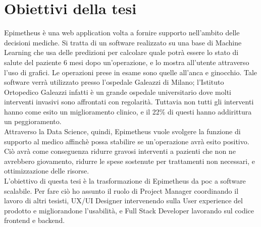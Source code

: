 \section{Obiettivi della tesi}
Epimetheus è una web application volta a fornire supporto nell'ambito delle decisioni mediche. Si tratta di un software realizzato su una base di Machine Learning che usa delle  predizioni per calcolare quale potrà essere lo stato di salute del paziente 6 mesi dopo un'operazione, e lo mostra all'utente attraverso l'uso di grafici. Le operazioni prese in esame sono quelle all'anca e ginocchio. Tale software verrà utilizzato presso l'ospedale Galeazzi di Milano; l'Istituto Ortopedico Galeazzi infatti è un grande ospedale universitario dove molti interventi invasivi sono affrontati con regolarità. Tuttavia non tutti gli interventi hanno come esito un miglioramento clinico, e il 22\% di questi hanno addirittura un peggioramento. \\
Attraverso la Data Science, quindi, Epimetheus vuole svolgere la funzione di supporto al medico affinchè possa stabilire se un'operazione avrà esito positivo. Ciò avrà come conseguenza ridurre gravosi interventi a pazienti che non ne avrebbero giovamento, ridurre le spese sostenute per trattamenti non necessari, e ottimizzazione delle risorse. \\

L'obiettivo di questa tesi è la trasformazione di Epimetheus da \gls{poc} a software scalabile. Per fare ciò ho assunto il ruolo di Project Manager coordinando il lavoro di altri tesisti, UX/UI Designer intervenendo sulla User experience del prodotto e migliorandone l'usabilità, e Full Stack Developer lavorando sul codice frontend e backend.

